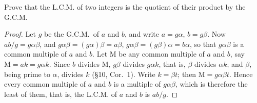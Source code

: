 \documentclass[DIN, pagenumber=false, fontsize=11pt, parskip=half]{scrartcl}
\begin{document}
\begin{problems}[from=1,step=1]
    \problem Prove that the L.C.M. of two integers is the quotient of their product by the G.C.M.

    \begin{proof}
        Let $g$ be the G.C.M.\ of $a$ and $b$, and write $a = g\alpha$, $b = g\beta$.
        Now $ab/g = g\alpha\beta$, and $g\alpha\beta = (g\alpha)\beta = a\beta$, $g\alpha\beta = (g\beta)\alpha = b\alpha$, so that $g\alpha\beta$ is a common multiple of $a$ and $b$.
        Let $\mathrm{M}$ be any common multiple of $a$ and $b$, say $\mathrm{M} = ak = g\alpha k$.
        Since $b$ divides $\mathrm{M}$, $g\beta$ divides $g\alpha k$, that is, $\beta$ divides $\alpha k$; and $\beta$, being prime to $\alpha$, divides $k$ (\S 10, Cor.\ 1).
        Write $k = \beta t$; then $\mathrm{M} = g\alpha\beta t$.
        Hence every common multiple of $a$ and $b$ is a multiple of $g\alpha\beta$, which is therefore the least of them, that is, the L.C.M. of $a$ and $b$ is $ab/g$.
    \end{proof}

\end{problems}
\end{document}
